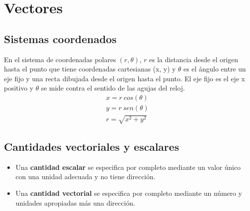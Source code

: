 \section{Vectores}
  \subsection{Sistemas coordenados}
    \PN En el sistema de coordenadas polares $(r, \theta)$, $r$ es la distancia desde el origen hasta el punto que tiene
    coordenadas cartesianas (x, y) y $\theta$ es el ángulo entre un eje fijo y una recta dibujada desde el origen hasta
    el punto. El eje fijo es el eje x positivo y $\theta$ se mide contra el sentido de las agujas del reloj.
    \begin{eqnarray*}
      x = r \ cos(\theta) \\
      y = r \ sen(\theta) \\
      r = \sqrt{x^{2} + y^{2}}
    \end{eqnarray*}

  \subsection{Cantidades vectoriales y escalares}
    \begin{itemize}
      \item Una \textbf{cantidad escalar} se especifica por completo mediante un valor único con una unidad adecuada y
      no tiene dirección.
      \item Una \textbf{cantidad vectorial} se especifica por completo mediante un número y unidades apropiadas más una
      dirección.
    \end{itemize}
